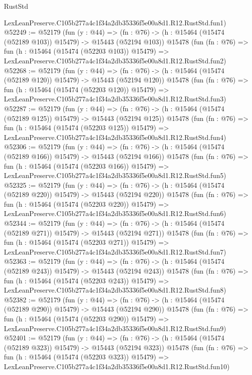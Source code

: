 \begin{lexlean}{RustStd}
\begin{coremodule}
    LexLeanPreserve.C105b277a4c1f34a2db35336f5e00a8d1.R12.RustStd.fun1)
@52249 := @52179
    (fun (y : @44) =>
    (fn : @76) -> (h : @15464 (@15474 (@52189 @103)) @15479) -> @15443 (@52194 @103))
    @15478
    (fun (fn : @76) =>
    fun (h : @15464 (@15474 (@52203 @103)) @15479) =>
    LexLeanPreserve.C105b277a4c1f34a2db35336f5e00a8d1.R12.RustStd.fun2)
@52268 := @52179
    (fun (y : @44) =>
    (fn : @76) -> (h : @15464 (@15474 (@52189 @120)) @15479) -> @15443 (@52194 @120))
    @15478
    (fun (fn : @76) =>
    fun (h : @15464 (@15474 (@52203 @120)) @15479) =>
    LexLeanPreserve.C105b277a4c1f34a2db35336f5e00a8d1.R12.RustStd.fun3)
@52287 := @52179
    (fun (y : @44) =>
    (fn : @76) -> (h : @15464 (@15474 (@52189 @125)) @15479) -> @15443 (@52194 @125))
    @15478
    (fun (fn : @76) =>
    fun (h : @15464 (@15474 (@52203 @125)) @15479) =>
    LexLeanPreserve.C105b277a4c1f34a2db35336f5e00a8d1.R12.RustStd.fun4)
@52306 := @52179
    (fun (y : @44) =>
    (fn : @76) -> (h : @15464 (@15474 (@52189 @166)) @15479) -> @15443 (@52194 @166))
    @15478
    (fun (fn : @76) =>
    fun (h : @15464 (@15474 (@52203 @166)) @15479) =>
    LexLeanPreserve.C105b277a4c1f34a2db35336f5e00a8d1.R12.RustStd.fun5)
@52325 := @52179
    (fun (y : @44) =>
    (fn : @76) -> (h : @15464 (@15474 (@52189 @220)) @15479) -> @15443 (@52194 @220))
    @15478
    (fun (fn : @76) =>
    fun (h : @15464 (@15474 (@52203 @220)) @15479) =>
    LexLeanPreserve.C105b277a4c1f34a2db35336f5e00a8d1.R12.RustStd.fun6)
@52344 := @52179
    (fun (y : @44) =>
    (fn : @76) -> (h : @15464 (@15474 (@52189 @271)) @15479) -> @15443 (@52194 @271))
    @15478
    (fun (fn : @76) =>
    fun (h : @15464 (@15474 (@52203 @271)) @15479) =>
    LexLeanPreserve.C105b277a4c1f34a2db35336f5e00a8d1.R12.RustStd.fun7)
@52363 := @52179
    (fun (y : @44) =>
    (fn : @76) -> (h : @15464 (@15474 (@52189 @243)) @15479) -> @15443 (@52194 @243))
    @15478
    (fun (fn : @76) =>
    fun (h : @15464 (@15474 (@52203 @243)) @15479) =>
    LexLeanPreserve.C105b277a4c1f34a2db35336f5e00a8d1.R12.RustStd.fun8)
@52382 := @52179
    (fun (y : @44) =>
    (fn : @76) -> (h : @15464 (@15474 (@52189 @290)) @15479) -> @15443 (@52194 @290))
    @15478
    (fun (fn : @76) =>
    fun (h : @15464 (@15474 (@52203 @290)) @15479) =>
    LexLeanPreserve.C105b277a4c1f34a2db35336f5e00a8d1.R12.RustStd.fun9)
@52401 := @52179
    (fun (y : @44) =>
    (fn : @76) -> (h : @15464 (@15474 (@52189 @323)) @15479) -> @15443 (@52194 @323))
    @15478
    (fun (fn : @76) =>
    fun (h : @15464 (@15474 (@52203 @323)) @15479) =>
    LexLeanPreserve.C105b277a4c1f34a2db35336f5e00a8d1.R12.RustStd.fun10)

\end{coremodule}
\end{lexlean}
